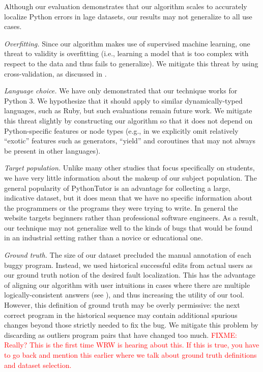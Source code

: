 \documentclass[conference]{IEEEtran}
\newcommand{\fixme}[1]{\textcolor{red}{FIXME: #1}}
\begin{document}
Although our evaluation demonstrates that our algorithm scales to
accurately localize Python errors in lage datasets, our results may not
generalize to all use cases.

\emph{Overfitting.} Since our algorithm makes use of supervised machine
learning, one threat to validity is overfitting (i.e., learning a model
that is too complex with respect to the data and thus fails to generalize).
We mitigate this threat by using cross-validation, as discussed in
.

\emph{Language choice.} We have only demonstrated that our technique works
for Python 3. We hypothesize that it should apply to similar
dynamically-typed languages, such as Ruby, but such evaluations remain
future work. We mitigate this threat slightly by constructing our algorithm
so that it does not depend on Python-specific features or node types
(e.g., in  we explicitly omit relatively ``exotic''
features such as generators, ``yield'' and coroutines that may not always
be present in other languages).

\emph{Target population.} Unlike many other studies that focus specifically
on students, we have very little information about the makeup of our
subject population. The general popularity of PythonTutor is an advantage
for collecting a large, indicative dataset, but it does mean that we have
no specific information about the programmers or the programs they were
trying to write. In general the website targets beginners rather than
professional software engineers. As a result, our technique may not
generalize well to the kinds of bugs that would be found in an industrial
setting rather than a novice or educational one.

\emph{Ground truth.} The size of our dataset precluded the manual annotation
of each buggy program. Instead, we used historical successful
edits from actual users as our ground truth notion of the desired fault
localization. This has the advantage of aligning our algorithm with user
intuitions in cases where there are multiple logically-consistent answers
(see ), and thus increasing the utility of our tool. However,
this definition of ground truth may be overly permissive: the next
correct program in the historical sequence may contain additional spurious
changes beyond those strictly needed to fix the bug.
We mitigate this problem by discarding as outliers program pairs that have
changed too much. \fixme{Really? This is the first time WRW is hearing
about this. If this is true, you have to go back and mention this earlier
where we talk about ground truth definitions and dataset selection.}
\end{document}
